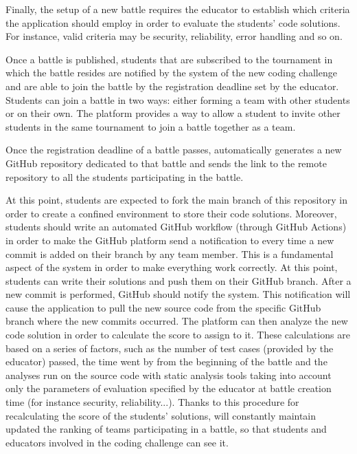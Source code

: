 	Finally, the setup of a new battle requires the educator to establish which criteria the application should employ in order to evaluate the students' code solutions. For instance, valid criteria may be security, reliability, error handling and so on.
	
	Once a battle is published, students that are subscribed to the tournament in which the battle resides are notified by the system of the new coding challenge and are able to join the battle by the registration deadline set by the educator.
	Students can join a battle in two ways: either forming a team with other students or on their own. The platform provides a way to allow a student to invite other students in the same tournament to join a battle together as a team.
	
	Once the registration deadline of a battle passes, \app automatically generates a new GitHub repository dedicated to that battle and sends the link to the remote repository to all the students participating in the battle.
	
	At this point, students are expected to fork the main branch of this repository in order to create a confined environment to store their code solutions. Moreover, students should write an automated GitHub workflow (through GitHub Actions) in order to make the GitHub platform send a notification to \app every time a new commit is added on their branch by any team member. This is a fundamental aspect of the system in order to make everything work correctly.
	At this point, students can write their solutions and push them on their GitHub branch. After a new commit is performed, GitHub should notify the \app system. 
	This notification will cause the \app application to pull the new source code from the specific GitHub branch where the new commits occurred. The platform can then analyze the new code solution in order to calculate the score to assign to it. These calculations are based on a series of factors, such as the number of test cases (provided by the educator) passed, the time went by from the beginning of the battle and the analyses run on the source code with static analysis tools taking into account only the parameters of evaluation specified by the educator at battle creation time (for instance security, reliability...).
	Thanks to this procedure for recalculating the score of the students' solutions, \app will constantly maintain updated the ranking of teams participating in a battle, so that students and educators involved in the coding challenge can see it.
	
